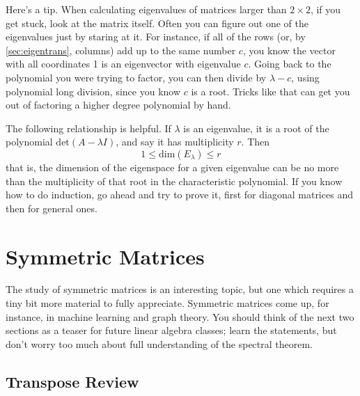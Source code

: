 \documentclass[Main.tex]{subfiles}
\begin{document}
\begin{Remark}
  Here's a tip.
  When calculating eigenvalues of matrices larger than $2\times 2$, if you get stuck, look at the matrix itself.
  Often you can figure out one of the eigenvalues just by staring at it.
  For instance, if all of the rows (or, by \ref{sec:eigentrans}, columns) add up to the same number $c$, you know the vector with all coordinates 1 is an eigenvector with eigenvalue $c$.
  Going back to the polynomial you were trying to factor, you can then divide by $\lambda - c$, using polynomial long division, since you know $c$ is a root.
  Tricks like that can get you out of factoring a higher degree polynomial by hand.
\end{Remark}

\begin{Remark}
  The following relationship is helpful.  
  If $\lambda$ is an eigenvalue, it is a root of the polynomial $\mbox{det}(A-\lambda I)$, and say it has multiplicity $r$.
  Then 
  \[1 \le \mbox{dim}(E_\lambda) \le r\]
  that is, the dimension of the eigenspace for a given eigenvalue can be no more than the multiplicity of that root in the characteristic polynomial.  
  If you know how to do induction, go ahead and try to prove it, first for diagonal matrices and then for general ones.  
\end{Remark}

\exersisess

\section{Symmetric Matrices}

The study of symmetric matrices is an interesting topic, but one which requires a tiny bit more material to fully appreciate.
Symmetric matrices come up, for instance, in machine learning and graph theory.  
You should think of the next two sections as a teaser for future linear algebra classes; learn the statements, but don't worry too much about full understanding of the spectral theorem.


\subsection{Transpose Review}
\end{document}
